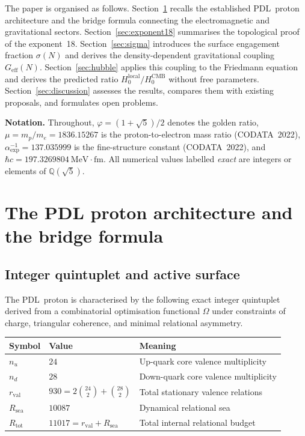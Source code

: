 \documentclass[11pt,a4paper]{article}
\theoremstyle{definition}
\newcommand{\PDL}{\textnormal{PDL}}
\newcommand{\Rsea}{R_{\mathrm{sea}}}
\newcommand{\Rtot}{R_{\mathrm{tot}}}
\newcommand{\rval}{r_{\mathrm{val}}}
\newcommand{\vp}{\varphi}
\newcommand{\Geff}{G_{\mathrm{eff}}}
\newcommand{\Hzero}{H_0}
\newcommand{\sig}{\sigma}
\begin{document}
The paper is organised as follows. Section~\ref{sec:proton} recalls the established \PDL\ proton architecture and the bridge formula connecting the electromagnetic and gravitational sectors. Section~\ref{sec:exponent18} summarises the topological proof of the exponent~18. Section~\ref{sec:sigma} introduces the surface engagement fraction $\sig(N)$ and derives the density-dependent gravitational coupling $\Geff(N)$. Section~\ref{sec:hubble} applies this coupling to the Friedmann equation and derives the predicted ratio $\Hzero^{\mathrm{local}}/\Hzero^{\mathrm{CMB}}$ without free parameters. Section~\ref{sec:discussion} assesses the results, compares them with existing proposals, and formulates open problems.

\medskip\noindent\textbf{Notation.} Throughout, $\vp = (1+\sqrt{5})/2$ denotes the golden ratio, $\mu = m_p/m_e = 1836.15267$ is the proton-to-electron mass ratio (CODATA~2022), $\alpha_{\exp}^{-1} = 137.035999$ is the fine-structure constant (CODATA~2022), and $\hbar c = 197.3269804\ \mathrm{MeV\cdot fm}$. All numerical values labelled \emph{exact} are integers or elements of $\mathbb{Q}(\sqrt{5})$.

\section{The PDL proton architecture and the bridge formula}
\label{sec:proton}

\subsection{Integer quintuplet and active surface}
\label{subsec:quintuplet}

The \PDL\ proton is characterised by the following exact integer quintuplet derived from a combinatorial optimisation functional $\Omega$ under constraints of charge, triangular coherence, and minimal relational asymmetry.\cite{Combinatorial_Proton_v2_2026}

\begin{center}
\begin{tabular}{lll}
\toprule
Symbol & Value & Meaning \\
\midrule
$n_u$ & $24$ & Up-quark core valence multiplicity \\
$n_d$ & $28$ & Down-quark core valence multiplicity \\
$\rval$ & $930 = 2\binom{24}{2} + \binom{28}{2}$ & Total stationary valence relations \\
$\Rsea$ & $10087$ & Dynamical relational sea \\
$\Rtot$ & $11017 = \rval + \Rsea$ & Total internal relational budget \\
\bottomrule
\end{tabular}
\end{center}
\end{document}
